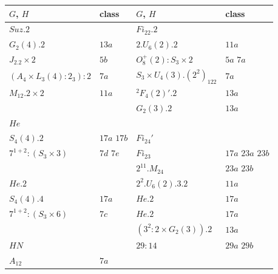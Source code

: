 \documentclass{article}
\theoremstyle{remark}
\theoremstyle{definition}
\begin{document}
\begin{table}
\centering

\begin{tabular}{|l | l || l | l|} \hline  \underline{$G$}, $H$ & class & \underline{$G$}, $H$  & class \\
\hline \hline
\underline{$Suz.2$}                     &                   &       \underline{$Fi_{22}.2$}                    &  \\
$G_2(4).2$                   & $13a$             & $2.U_6(2).2$                       & $11a$ \\
$J_2.2\times 2$              & $5b$              & $O_8^+(2):S_3\times 2$               & $5a$ $7a$ \\
$(A_4\times L_3(4):2_3):2$  & $7a$               & $S_3\times U_4(3).(2^2)_{122}$     & $7a$ \\
$M_{12}.2\times 2$               & $11a$             & ${}^2F_4(2)'.2$                         & $13a$ \\
                            &                   & $G_2(3).2$                           & $13a$ \\
\underline{$He$}                          &                   &                                   &  \\
$S_4(4).2$                     & $17a$ $17b$       & \underline{$Fi_{24}'$}                             &  \\
$7^{1+2}:(S_3\times 3)$        &  $7d$   $7e$      & $Fi_{23}$                              &  $17a$   $23a$   $23b$  \\
                            &                   & $2^{11}.M_{24}$                             &  $23a$   $23b$  \\
\underline{$He.2$}                        &                   & $2^2.U_6(2).3.2$                     & $11a$ \\
$S_4(4).4$                     &  $17a$            & $He.2$                              &  $17a$  \\
$7^{1+2}:(S_3\times 6)$        & $7c$              & $He.2$                            &  $17a$  \\
                            &                   & $(3^2:2\times G_2(3)).2$             & $13a$ \\
\underline{$HN$}                          &                   & $29:14$                          &  $29a$   $29b$  \\
$A_{12}$                         & $7a$              &                                   &  \\

\end{tabular}
\end{table}
\end{document}
